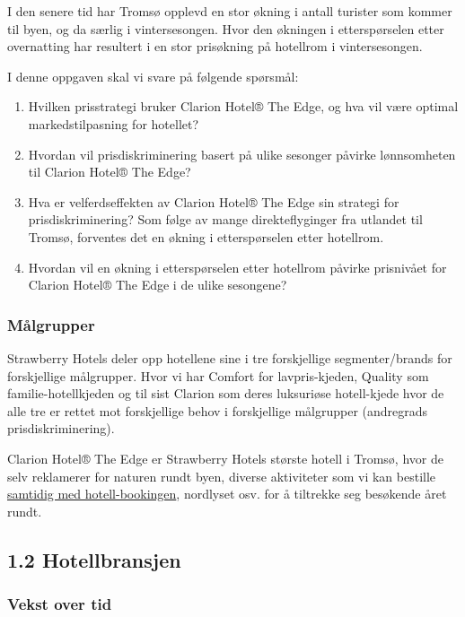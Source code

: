\documentclass[
  12pt,
  a4paper,
  DIV=11,
  numbers=noendperiod]{scrartcl}
\begin{document}
I den senere tid har Tromsø opplevd en stor økning i antall turister som
kommer til byen, og da særlig i vintersesongen. Hvor den økningen i
etterspørselen etter overnatting har resultert i en stor prisøkning på
hotellrom i vintersesongen.

I denne oppgaven skal vi svare på følgende spørsmål:

\begin{enumerate}
\def\labelenumi{\arabic{enumi}.}
\item
  Hvilken prisstrategi bruker Clarion Hotel® The Edge, og hva vil være
  optimal markedstilpasning for hotellet?
\item
  Hvordan vil prisdiskriminering basert på ulike sesonger påvirke
  lønnsomheten til Clarion Hotel® The Edge?
\item
  Hva er velferdseffekten av Clarion Hotel® The Edge sin strategi for
  prisdiskriminering? Som følge av mange direkteflyginger fra utlandet
  til Tromsø, forventes det en økning i etterspørselen etter hotellrom.
\item
  Hvordan vil en økning i etterspørselen etter hotellrom påvirke
  prisnivået for Clarion Hotel® The Edge i de ulike sesongene?
\end{enumerate}

\subsubsection{Målgrupper}\label{muxe5lgrupper}

Strawberry Hotels deler opp hotellene sine i tre forskjellige
segmenter/brands for forskjellige målgrupper. Hvor vi har Comfort for
lavpris-kjeden, Quality som familie-hotellkjeden og til sist Clarion som
deres luksuriøse hotell-kjede hvor de alle tre er rettet mot
forskjellige behov i forskjellige målgrupper (andregrads
prisdiskriminering).

Clarion Hotel® The Edge er Strawberry Hotels største hotell i Tromsø,
hvor de selv reklamerer for naturen rundt byen, diverse aktiviteter som
vi kan bestille
\href{https://www.strawberryhotels.com/packages/tromso}{samtidig med hotell-bookingen},
nordlyset osv. for å tiltrekke seg besøkende året rundt.

\newpage

\subsection{1.2 Hotellbransjen}\label{hotellbransjen}

\subsubsection{Vekst over tid}\label{vekst-over-tid}
\end{document}
